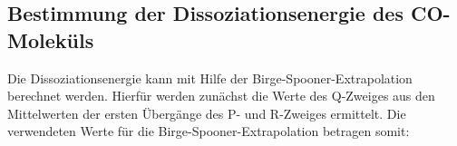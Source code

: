 \documentclass{article}
\begin{document}
\subsection{Bestimmung der Dissoziationsenergie des CO-Moleküls}

Die Dissoziationsenergie kann mit Hilfe der Birge-Spooner-Extrapolation berechnet werden. Hierfür werden zunächst die Werte des Q-Zweiges aus den Mittelwerten der ersten Übergänge des P- und R-Zweiges ermittelt.
Die verwendeten Werte für die Birge-Spooner-Extrapolation betragen somit:



\end{document}
